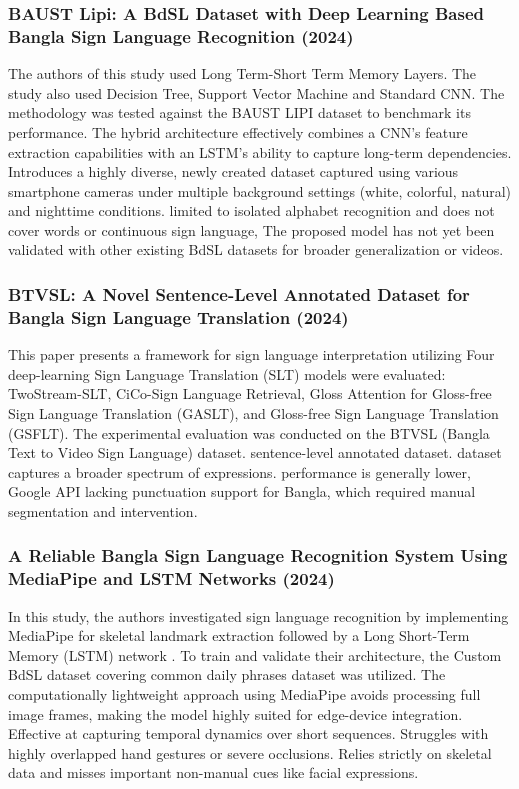 \subsubsection{BAUST Lipi: A BdSL Dataset with Deep Learning Based Bangla Sign Language Recognition (2024)}
The authors of this study used Long Term-Short Term Memory Layers. The study also used Decision Tree, Support Vector Machine and Standard CNN. The methodology was tested against the BAUST LIPI dataset to benchmark its performance. The hybrid architecture effectively combines a CNN's feature extraction capabilities with an LSTM's ability to capture long-term dependencies. Introduces a highly diverse, newly created dataset captured using various smartphone cameras under multiple background settings (white, colorful, natural) and nighttime conditions. limited to isolated alphabet recognition and does not cover words or continuous sign language, The proposed model has not yet been validated with other existing BdSL datasets for broader generalization or videos.\cite{study_baust_lipi_2024}

\subsubsection{BTVSL: A Novel Sentence-Level Annotated Dataset for Bangla Sign Language Translation (2024)}\cite{study_btvsl_2024}
This paper presents a framework for sign language interpretation utilizing Four deep-learning Sign Language Translation (SLT) models were evaluated: TwoStream-SLT, CiCo-Sign Language Retrieval, Gloss Attention for Gloss-free Sign Language Translation (GASLT), and Gloss-free Sign Language Translation (GSFLT). The experimental evaluation was conducted on the BTVSL (Bangla Text to Video Sign Language) dataset. sentence-level annotated dataset. dataset captures a broader spectrum of expressions. performance is generally lower, Google API lacking punctuation support for Bangla, which required manual segmentation and intervention.

\subsubsection{A Reliable Bangla Sign Language Recognition System Using MediaPipe and LSTM Networks (2024)}\cite{study_reliable_mediapipe_2024}
In this study, the authors investigated sign language recognition by implementing MediaPipe for skeletal landmark extraction followed by a Long Short-Term Memory (LSTM) network \cite{92, 93}. To train and validate their architecture, the Custom BdSL dataset covering common daily phrases dataset was utilized. The computationally lightweight approach using MediaPipe avoids processing full image frames, making the model highly suited for edge-device integration. Effective at capturing temporal dynamics over short sequences. Struggles with highly overlapped hand gestures or severe occlusions. Relies strictly on skeletal data and misses important non-manual cues like facial expressions.

